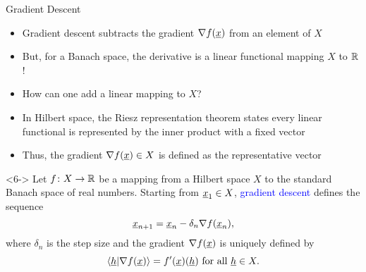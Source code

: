 \documentclass[10pt,letterpaper,english]{beamer}
\newcommand{\backupbegin}{
   \newcounter{finalframe}
   \setcounter{finalframe}{\value{framenumber}}
}
\newcommand{\backupend}{
   \setcounter{framenumber}{\value{finalframe}}
}
\begin{document}
\begin{frame}{Gradient Descent}

\begin{itemize}
\item<1-> Gradient descent subtracts the gradient $\nabla f(\underline{x})$ from an element of $X\!\!\!$ \vspace{1mm}

\item<2-> But, for a Banach space, the derivative is a linear functional mapping $X$ to $\mathbb{R}$!

\item<3-> How can one add a linear mapping to $X$?

\item<4-> In Hilbert space, the Riesz representation theorem states every linear functional is represented by the inner product with a fixed vector

\item<5-> Thus, the gradient $\nabla f (\underline{x}) \in X$ is defined as the representative vector
\end{itemize}

\begin{definition}<6->
Let $f \colon X \rightarrow \mathbb{R}$ be a mapping from a Hilbert space $X$ to the standard Banach space of real numbers.
Starting from $\underline{x}_1 \in X$, \textcolor{blue}{gradient descent} defines the sequence \vspace{-4mm}
\[ \underline{x}_{n+1} = \underline{x}_n - \delta_n \nabla f(\underline{x}_n), \]
where $\delta_n$ is the step size and the gradient $\nabla f (\underline{x})$ is uniquely defined by \vspace{-1.5mm}
\[\langle \underline{h} | \nabla f(\underline{x}) \rangle = f'(\underline{x})(\underline{h}) \text{ for all } \underline{h} \in X. \]
\end{definition}


\end{frame}


\backupbegin


%
%

\backupend
\end{document}
